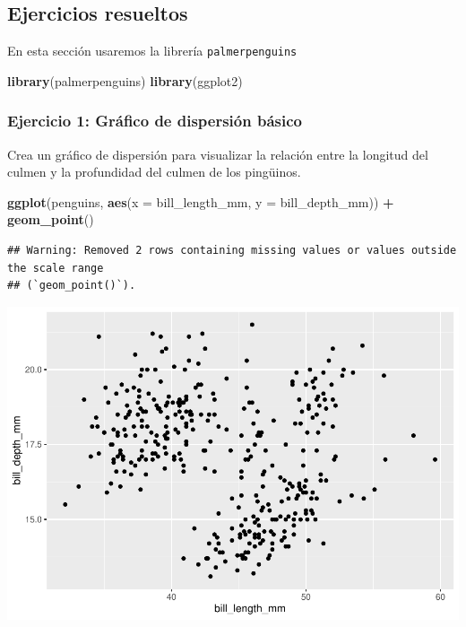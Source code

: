 \documentclass[
]{book}
\newenvironment{Shaded}{\begin{snugshade}}{\end{snugshade}}
\newcommand{\AttributeTok}[1]{\textcolor[rgb]{0.13,0.29,0.53}{#1}}
\newcommand{\FunctionTok}[1]{\textcolor[rgb]{0.13,0.29,0.53}{\textbf{#1}}}
\newcommand{\NormalTok}[1]{#1}
\newcommand{\SpecialCharTok}[1]{\textcolor[rgb]{0.81,0.36,0.00}{\textbf{#1}}}
\begin{document}
\subsection{Ejercicios resueltos}\label{ejercicios-resueltos}

En esta sección usaremos la librería \texttt{palmerpenguins}

\begin{Shaded}
\begin{Highlighting}[]
\FunctionTok{library}\NormalTok{(palmerpenguins)}
\FunctionTok{library}\NormalTok{(ggplot2)}
\end{Highlighting}
\end{Shaded}

\subsubsection{Ejercicio 1: Gráfico de dispersión básico}\label{ejercicio-1-gruxe1fico-de-dispersiuxf3n-buxe1sico}

Crea un gráfico de dispersión para visualizar la relación entre la longitud del culmen y la profundidad del culmen de los pingüinos.

\begin{Shaded}
\begin{Highlighting}[]
\FunctionTok{ggplot}\NormalTok{(penguins, }\FunctionTok{aes}\NormalTok{(}\AttributeTok{x =}\NormalTok{ bill\_length\_mm, }\AttributeTok{y =}\NormalTok{ bill\_depth\_mm)) }\SpecialCharTok{+}
  \FunctionTok{geom\_point}\NormalTok{()}
\end{Highlighting}
\end{Shaded}

\begin{verbatim}
## Warning: Removed 2 rows containing missing values or values outside the scale range
## (`geom_point()`).
\end{verbatim}

\includegraphics{bookdown-demo_files/figure-latex/unnamed-chunk-183-1.pdf}
\end{document}
